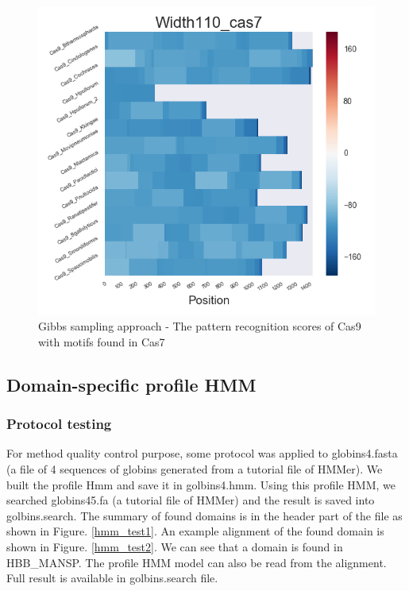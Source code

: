 \documentclass[11pt, oneside]{article}
\begin{document}
\begin{figure}[htbp]
\begin{minipage}{0.32\textwidth}
  \end{minipage}
  \hfill
  \begin{minipage}{0.32\textwidth}
    \centering
    \includegraphics[width=1\textwidth]{images/Width110_cas7_heatmap} %
  \end{minipage}
  \caption{Gibbs sampling approach - The pattern recognition scores of Cas9 with motifs found in Cas7}
  \label{fig:cas7_recog}
\end{figure}


\subsection{Domain-specific profile HMM}

\subsubsection{Protocol testing}

For method quality control purpose, some protocol was applied to globins4.fasta (a file of 4 sequences of globins generated from a tutorial file of HMMer). We built the profile Hmm and save it in golbins4.hmm. Using this profile HMM, we searched globins45.fa (a tutorial file of HMMer) and the result is saved into golbins.search. The summary of found domains is in the header part of the file as shown in Figure. \ref{hmm_test1}.  An example alignment of the found domain is shown in Figure. \ref{hmm_test2}. We can see that a domain is found in HBB\_MANSP. The profile HMM model can also be read from the alignment. Full result is available in golbins.search file.
\end{document}

